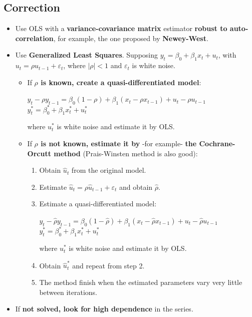 \documentclass[10pt, a4paper, landscape]{extarticle}
\begin{document}
\begin{multicols}{3}
	\subsection*{Correction}
		\begin{itemize}[leftmargin=*]
			\item Use OLS with a \textbf{variance-covariance matrix} estimator \textbf{robust to auto-correlation}, for example, the one proposed by \textbf{Newey-West}.
			\item Use \textbf{Generalized Least Squares}. Supposing $y_t = \beta_0 + \beta_1 x_t + u_t$, with $u_t = \rho u_{t-1} + \varepsilon_t$, where $|\rho| < 1$ and $\varepsilon_t$ is white noise.
			\begin{itemize}[leftmargin=*]
				\item If \textbf{$\rho$ is known, create a quasi-differentiated model}:
				\begin{center}
					$y_t - \rho y_{t-1} = \beta_0 (1 - \rho) + \beta_1 (x_t - \rho x_{t-1}) + u_t - \rho u_{t-1}$
					\ $y_t^* = \beta_0^* + \beta_1 x_t^* + u_t^*$
				\end{center}
				where $u_t^*$ is white noise and estimate it by OLS.
				\item If \textbf{$\rho$ is not known, estimate it by} -for example- \textbf{the Cochrane-Orcutt method} (Prais-Winsten method is also good):
				\begin{enumerate}[leftmargin=*]
					\item Obtain $\hat{u}_t$ from the original model.
					\item Estimate $\hat{u}_t = \rho \hat{u}_{t-1} + \varepsilon_t$ and obtain $\hat{\rho}$.
					\item Estimate a quasi-differentiated model:
					\begin{center}
						$y_t - \hat{\rho} y_{t-1} = \beta_0 (1 - \hat{\rho}) + \beta_1 (x_t - \hat{\rho} x_{t-1}) + u_t - \hat{\rho} u_{t-1}$
						\ $y_t^* = \beta_0^* + \beta_1 x_t^* + u_t^*$
					\end{center}
					where $u_t^*$ is white noise and estimate it by OLS.
					\item Obtain $\hat{u}_t^*$ and repeat from step 2.
					\item The method finish when the estimated parameters vary very little between iterations.
				\end{enumerate}
			\end{itemize}
		\item If \textbf{not solved, look for high dependence} in the series.
		\end{itemize}


\end{multicols}
\end{document}
